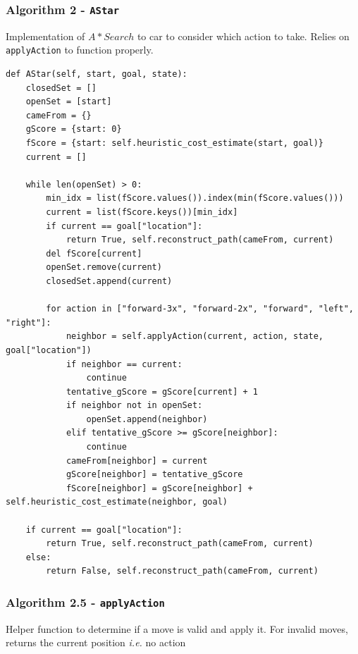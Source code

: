 \documentclass[12pt, letterpaper]{article}
\begin{document}
\subsubsection{Algorithm 2 - \texttt{AStar}}

Implementation of $A* Search$ to car to consider which action to take. Relies on \texttt{applyAction} to function properly.

\begin{mdframed}[backgroundcolor=shadecolor]
\begin{verbatim}
def AStar(self, start, goal, state):    
    closedSet = []
    openSet = [start]
    cameFrom = {}
    gScore = {start: 0}
    fScore = {start: self.heuristic_cost_estimate(start, goal)}
    current = []
    
    while len(openSet) > 0:
        min_idx = list(fScore.values()).index(min(fScore.values()))
        current = list(fScore.keys())[min_idx]
        if current == goal["location"]:
            return True, self.reconstruct_path(cameFrom, current)
        del fScore[current]
        openSet.remove(current)
        closedSet.append(current)
        
        for action in ["forward-3x", "forward-2x", "forward", "left", "right"]:
            neighbor = self.applyAction(current, action, state, goal["location"])
            if neighbor == current:
                continue
            tentative_gScore = gScore[current] + 1
            if neighbor not in openSet:
                openSet.append(neighbor)
            elif tentative_gScore >= gScore[neighbor]:
                continue
            cameFrom[neighbor] = current
            gScore[neighbor] = tentative_gScore
            fScore[neighbor] = gScore[neighbor] + self.heuristic_cost_estimate(neighbor, goal)
        
    if current == goal["location"]:
        return True, self.reconstruct_path(cameFrom, current)
    else:
        return False, self.reconstruct_path(cameFrom, current)
\end{verbatim}
\end{mdframed}

\subsubsection{Algorithm 2.5 - \texttt{applyAction}}

Helper function to determine if a move is valid and apply it. For invalid moves, returns the current position \textit{i.e.} no action
\end{document}
